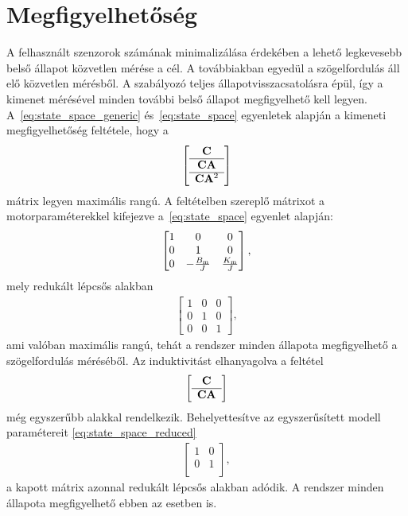 \section{Megfigyelhetőség}\label{chap:observability}
A felhasznált szenzorok számának minimalizálása érdekében a lehető legkevesebb belső állapot közvetlen mérése 
a cél. A továbbiakban egyedül a szögelfordulás áll elő közvetlen mérésből. 
A szabályozó teljes állapotvisszacsatolásra épül, így a kimenet mérésével minden további belső állapot 
megfigyelhető kell legyen. 
A~\eqref{eq:state_space_generic} és~\eqref{eq:state_space} egyenletek alapján a kimeneti megfigyelhetőség feltétele, hogy a
\begin{align}\label{eq:observability_generic}
    \left[\begin{array}{c}
        \mathbf{C} \\ \hline
        \mathbf{CA} \\ \hline
        \mathbf{C} \mathbf{A}^2
    \end{array}\right]
\end{align}
mátrix legyen maximális rangú. A feltételben szereplő mátrixot a motorparaméterekkel kifejezve 
a~\eqref{eq:state_space} egyenlet alapján:
\begin{align}
    \begin{bmatrix}
        1 & 0 & 0 \\
        0 & 1 & 0 \\
        0 & -\frac{B_{\mathrm{m}}}{J} & \frac{K_{\mathrm{m}}}{J}
    \end{bmatrix},
\end{align}
mely redukált lépcsős alakban
\begin{align}
    \begin{bmatrix}
        1 & 0 & 0 \\
        0 & 1 & 0 \\
        0 & 0 & 1
    \end{bmatrix},
\end{align}
ami valóban maximális rangú, tehát a rendszer minden állapota megfigyelhető a szögelfordulás méréséből.
Az induktivitást elhanyagolva a feltétel 
\begin{align}
    \left[\begin{array}{c}
        \mathbf{C} \\ \hline
        \mathbf{CA} \\
    \end{array}\right]
\end{align}
még egyszerűbb alakkal rendelkezik. Behelyettesítve az egyszerűsített modell paramétereit 
\eqref{eq:state_space_reduced}
\begin{align}
    \begin{bmatrix}
        1 & 0 \\
        0 & 1 \\
    \end{bmatrix},
\end{align}
a kapott mátrix azonnal redukált lépcsős alakban adódik. A rendszer minden állapota megfigyelhető 
ebben az esetben is. 

